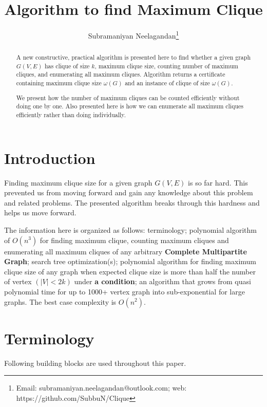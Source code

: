 \documentclass[12pt]{article}
\theoremstyle{plain}
\theoremstyle{definition}
\begin{document}
	\title{Algorithm to find Maximum Clique}
	\author[1]{Subramaniyan Neelagandan\footnote{Email: subramaniyan.neelagandan@outlook.com; web: https://github.com/SubbuN/Clique}}
	
	\date{}
	\maketitle

\begin{abstract}
	A new constructive, practical algorithm is presented here to find whether a given graph $G(V,E)$ has clique of size $k$, maximum clique size, counting number of maximum cliques, and enumerating all maximum cliques. Algorithm returns a certificate containing maximum clique size $\omega(G)$ and an instance of clique of size $\omega(G)$.
	
	We present how the number of maximum cliques can be counted efficiently without doing one by one. Also presented here is how we can enumerate all maximum cliques efficiently rather than doing individually.
\end{abstract}


\section{Introduction}
Finding maximum clique size for a given graph $G(V,E)$ is so far hard. This prevented us from moving forward and gain any knowledge about this problem and related problems. The presented algorithm breaks through this hardness and helps us move forward.

The information here is organized as follows: terminology; polynomial algorithm of $O(n^3)$ for finding maximum clique, counting maximum cliques and enumerating all maximum cliques of any arbitrary \textbf{Complete Multipartite Graph}; search tree optimization(s); polynomial algorithm for finding maximum clique size of any graph when expected clique size is more than half the number of vertex $(|V| < 2k)$ under \textbf{a condition}; an algorithm that grows from quasi polynomial time for up to 1000+ vertex graph into sub-exponential for large graphs. The best case complexity is $O(n^2)$.

\section{Terminology}
Following building blocks are used throughout this paper.
\end{document}
